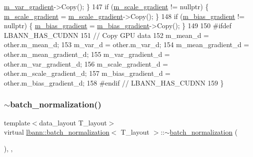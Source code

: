 \begin{DoxyCode}
      \hyperlink{classlbann_1_1batch__normalization_aa2d2050a265eed854aa8950cd1461af9}{m\_var\_gradient}->Copy(); \}
147     \textcolor{keywordflow}{if} (\hyperlink{classlbann_1_1batch__normalization_a66364e1b0c9afb40a4c03ee1869d264c}{m\_scale\_gradient} != \textcolor{keyword}{nullptr}) \{ \hyperlink{classlbann_1_1batch__normalization_a66364e1b0c9afb40a4c03ee1869d264c}{m\_scale\_gradient} = 
      \hyperlink{classlbann_1_1batch__normalization_a66364e1b0c9afb40a4c03ee1869d264c}{m\_scale\_gradient}->Copy(); \}
148     \textcolor{keywordflow}{if} (\hyperlink{classlbann_1_1batch__normalization_aa0f1e9a9f48f67544618e239167494bb}{m\_bias\_gradient} != \textcolor{keyword}{nullptr})  \{ \hyperlink{classlbann_1_1batch__normalization_aa0f1e9a9f48f67544618e239167494bb}{m\_bias\_gradient} = 
      \hyperlink{classlbann_1_1batch__normalization_aa0f1e9a9f48f67544618e239167494bb}{m\_bias\_gradient}->Copy(); \}
149 
150 \textcolor{preprocessor}{  #ifdef LBANN\_HAS\_CUDNN}
151     \textcolor{comment}{// Copy GPU data}
152     m\_mean\_d = other.m\_mean\_d;
153     m\_var\_d = other.m\_var\_d;
154     m\_mean\_gradient\_d = other.m\_mean\_gradient\_d;
155     m\_var\_gradient\_d = other.m\_var\_gradient\_d;
156     m\_scale\_gradient\_d = other.m\_scale\_gradient\_d;
157     m\_bias\_gradient\_d = other.m\_bias\_gradient\_d;
158 \textcolor{preprocessor}{  #endif // LBANN\_HAS\_CUDNN}
159   \}
\end{DoxyCode}
\mbox{\label{classlbann_1_1batch__normalization_a6aeb06e13733560fb2203ea08df42632}} 
\subsubsection{\texorpdfstring{$\sim$batch\+\_\+normalization()}{~batch\_normalization()}}
{\footnotesize\ttfamily template$<$data\+\_\+layout T\+\_\+layout$>$ \\
virtual \hyperlink{classlbann_1_1batch__normalization}{lbann\+::batch\+\_\+normalization}$<$ T\+\_\+layout $>$\+::$\sim$\hyperlink{classlbann_1_1batch__normalization}{batch\+\_\+normalization} (\begin{DoxyParamCaption}{ }\end{DoxyParamCaption})\hspace{0.3cm}{\ttfamily [inline]}, {\ttfamily [override]}, {\ttfamily [virtual]}}



